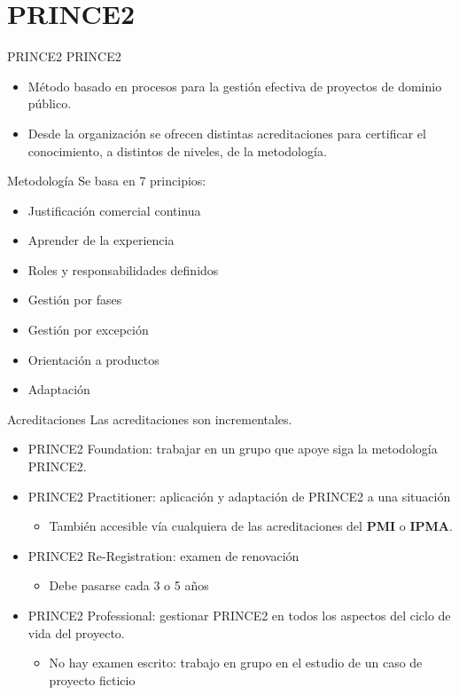 \section{PRINCE2}
\begin{frame}[allowframebreaks]{PRINCE2}
	PRINCE2 
	\begin{itemize}
		\item Método basado en procesos para la gestión efectiva de proyectos de dominio público.
		\item Desde la organización se ofrecen distintas acreditaciones para certificar el conocimiento, a distintos de niveles, de la metodología.
	\end{itemize}
	
	\framebreak
	
	\begin{block}{Metodología}
		Se basa en 7 principios:
		\begin{itemize}
			\item Justificación comercial continua
			\item Aprender de la experiencia
			\item Roles y responsabilidades definidos
			\item Gestión por fases
			\item Gestión por excepción
			\item Orientación a productos
			\item Adaptación
		\end{itemize}
	\end{block}
	
	\framebreak
	
	\begin{block}{Acreditaciones}
		Las acreditaciones son incrementales.
		\begin{itemize}
			\item PRINCE2 Foundation: trabajar en un grupo que apoye siga la metodología PRINCE2.
			\item PRINCE2 Practitioner: aplicación y adaptación de PRINCE2 a una situación
			\begin{itemize}
				\item También accesible vía cualquiera de las acreditaciones del \textbf{PMI} o \textbf{IPMA}.
			\end{itemize}
			\item PRINCE2 Re-Registration: examen de renovación
			\begin{itemize}
				\item Debe pasarse cada 3 o 5 años
			\end{itemize}
			\item PRINCE2 Professional: gestionar PRINCE2 en todos los aspectos del ciclo de vida del proyecto.
			\begin{itemize}
				\item No hay examen escrito: trabajo en grupo en el estudio de un caso de proyecto ficticio
			\end{itemize}
		\end{itemize}
	\end{block}
\end{frame}
